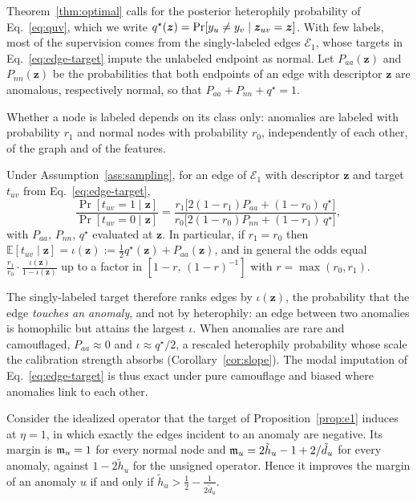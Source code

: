 Theorem~\ref{thm:optimal} calls for the posterior heterophily probability of Eq.~\eqref{eq:quv}, which we write $q^\star(\bm z)=\Pr[y_u\neq y_v\mid\bm{z}_{uv}=\bm z]$.
With few labels, most of the supervision comes from the singly-labeled edges $\mathcal E_1$, whose targets in Eq.~\eqref{eq:edge-target} impute the unlabeled endpoint as normal.
Let $P_{aa}(\bm z)$ and $P_{nn}(\bm z)$ be the probabilities that both endpoints of an edge with descriptor $\bm z$ are anomalous, respectively normal, so that $P_{aa}+P_{nn}+q^\star=1$.

\begin{assumption}\label{ass:sampling}
Whether a node is labeled depends on its class only: anomalies are labeled with probability $r_1$ and normal nodes with probability $r_0$, independently of each other, of the graph and of the features.
\end{assumption}

\begin{proposition}\label{prop:e1}
Under Assumption~\ref{ass:sampling}, for an edge of $\mathcal E_1$ with descriptor $\bm z$ and target $t_{uv}$ from Eq.~\eqref{eq:edge-target},
\[
\frac{\Pr[t_{uv}=1\mid\bm z]}{\Pr[t_{uv}=0\mid\bm z]}
=\frac{r_1\bigl[2(1-r_1)P_{aa}+(1-r_0)\,q^\star\bigr]}{r_0\bigl[2(1-r_0)P_{nn}+(1-r_1)\,q^\star\bigr]},
\]
with $P_{aa}$, $P_{nn}$, $q^\star$ evaluated at $\bm z$.
In particular, if $r_1=r_0$ then $\mathbb E[t_{uv}\mid\bm z]=\iota(\bm z):=\tfrac12q^\star(\bm z)+P_{aa}(\bm z)$, and in general the odds equal $\tfrac{r_1}{r_0}\cdot\tfrac{\iota(\bm z)}{1-\iota(\bm z)}$ up to a factor in $[1-r,\,(1-r)^{-1}]$ with $r=\max(r_0,r_1)$.
\end{proposition}

The singly-labeled target therefore ranks edges by $\iota(\bm z)$, the probability that the edge \emph{touches an anomaly}, and not by heterophily: an edge between two anomalies is homophilic but attains the largest $\iota$.
When anomalies are rare and camouflaged, $P_{aa}\approx0$ and $\iota\approx q^\star/2$, a rescaled heterophily probability whose scale the calibration strength absorbs (Corollary~\ref{cor:slope}).
The modal imputation of Eq.~\eqref{eq:edge-target} is thus exact under pure camouflage and biased where anomalies link to each other.

\begin{corollary}\label{cor:camouflage}
Consider the idealized operator that the target of Proposition~\ref{prop:e1} induces at $\eta=1$, in which exactly the edges incident to an anomaly are negative.
Its margin is $\mathfrak{m}_u=1$ for every normal node and $\mathfrak{m}_u=2\tilde h_u-1+2/\tilde d_u$ for every anomaly, against $1-2\tilde h_u$ for the unsigned operator.
Hence it improves the margin of an anomaly $u$ if and only if $\tilde h_u>\tfrac12-\tfrac{1}{2\tilde d_u}$.
\end{corollary}

